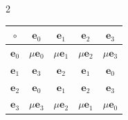\begin{multicols}{2}
\begin{center}





\vspace*{8pt}





\tabcolsep=8pt


{\small


\begin{tabular}{|c|c|c|c|c|}


  \hline


\multicolumn{1}{|c|}{$\circ$}&\multicolumn{1}{c|}{$\mathbf{e}_0$}&$\mathbf{e}_1$&


$\mathbf{e}_2$&$\mathbf{e}_3$\\


\hline


$\mathbf{e}_0$&$\mu\mathbf{e}_0$&$\mu\mathbf{e}_1$&$\mu\mathbf{e}_2$&$\mu\mathbf{e}_3$\\


\hline


$\mathbf{e}_1$&$\mathbf{e}_3$&$\mathbf{e}_2$&$\mathbf{e}_1$&$\mathbf{e}_0$\\


\hline


$\mathbf{e}_2$&$\mathbf{e}_0$&$\mathbf{e}_1$&$\mathbf{e}_2$&$\mathbf{e}_3$\\


\hline


$\mathbf{e}_3$&$\mu\mathbf{e}_3$&$\mu\mathbf{e}_2$&$\mu\mathbf{e}_1$&$\mu\mathbf{e}_0$\\


\hline


\end{tabular}


}


\vspace*{2pt}


\end{center}























\end{multicols}
